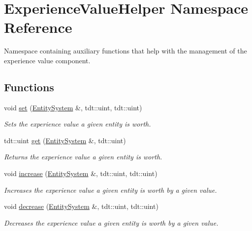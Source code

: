 \hypertarget{namespace_experience_value_helper}{}\section{Experience\+Value\+Helper Namespace Reference}
\label{namespace_experience_value_helper}


Namespace containing auxiliary functions that help with the management of the experience value component.  


\subsection*{Functions}
\begin{DoxyCompactItemize}
\item 
void \hyperlink{namespace_experience_value_helper_a7c74e224b09b30b75bc1e9c9b8cf9979}{set} (\hyperlink{class_entity_system}{Entity\+System} \&, tdt\+::uint, tdt\+::uint)
\begin{DoxyCompactList}\small\item\em Sets the experience value a given entity is worth. \end{DoxyCompactList}\item 
tdt\+::uint \hyperlink{namespace_experience_value_helper_a8285c801be9ecfa66991bbd395335856}{get} (\hyperlink{class_entity_system}{Entity\+System} \&, tdt\+::uint)
\begin{DoxyCompactList}\small\item\em Returns the experience value a given entity is worth. \end{DoxyCompactList}\item 
void \hyperlink{namespace_experience_value_helper_a36dc5b730971ed045c96f593a1cba6a3}{increase} (\hyperlink{class_entity_system}{Entity\+System} \&, tdt\+::uint, tdt\+::uint)
\begin{DoxyCompactList}\small\item\em Increases the experience value a given entity is worth by a given value. \end{DoxyCompactList}\item 
void \hyperlink{namespace_experience_value_helper_ab153780809e66479564032f39744bcf6}{decrease} (\hyperlink{class_entity_system}{Entity\+System} \&, tdt\+::uint, tdt\+::uint)
\begin{DoxyCompactList}\small\item\em Decreases the experience value a given entity is worth by a given value. \end{DoxyCompactList}\end{DoxyCompactItemize}


